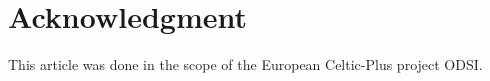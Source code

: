 \documentclass[conference]{IEEEtran}
\begin{document}


\section*{Acknowledgment}
This article was done in the scope of the European Celtic-Plus project ODSI.  







%
%
%

%
%
\end{document}
